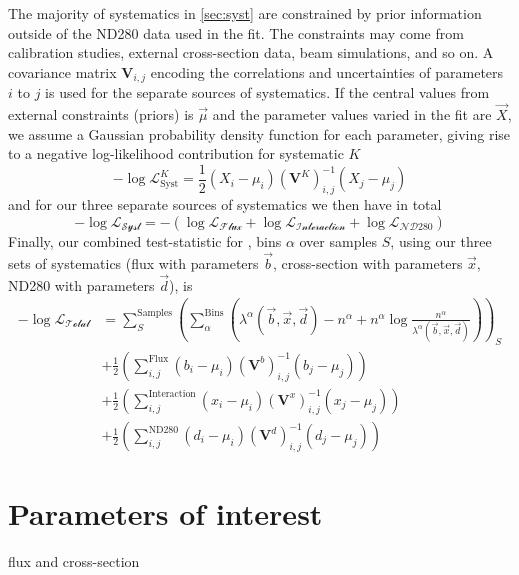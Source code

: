 The majority of systematics in \autoref{sec:syst} are constrained by prior information outside of the ND280 data used in the fit. The constraints may come from calibration studies, external cross-section data, beam simulations, and so on. A covariance matrix $\boldsymbol{V}_{i,j}$ encoding the correlations and uncertainties of parameters $i$ to $j$ is used for the separate sources of systematics. If the central values from external constraints (priors) is $\vec{\mu}$ and the parameter values varied in the fit are $\vec{X}$, we assume a Gaussian probability density function for each parameter, giving rise to a negative log-likelihood contribution for systematic $K$
\begin{equation}
-\log\mathcal{L}^K_\text{Syst} = \frac{1}{2}( X_i - \mu_i ) \left(\boldsymbol{V}^K\right)^{-1}_{i,j} ( X_j - \mu_j )
\end{equation}
and for our three separate sources of systematics we then have in total
\begin{equation}
-\log\mathcal{L_\text{Syst}} = -\left(\log\mathcal{L_\text{Flux}} + \log\mathcal{L_\text{Interaction}} + \log\mathcal{L_\text{ND280}}\right)
\end{equation}
Finally, our combined test-statistic for \pmu, \cosmu bins $\alpha$ over samples $S$, using our three sets of systematics (flux with parameters $\vec{b}$, cross-section with parameters $\vec{x}$, ND280 with parameters $\vec{d}$), is
\begin{equation}
\label{eq:test_stat}
\begin{split}
-\log\mathcal{L_\text{Total}} & =  \sum_S^\text{Samples} \left( \sum_{\alpha}^\text{Bins} \left( \lambda^\alpha(\vec{b},\vec{x},\vec{d}) - n^\alpha + n^\alpha\log\frac{n^\alpha}{\lambda^\alpha(\vec{b},\vec{x},\vec{d})} \right) \right)_S \\
 & + \frac{1}{2} \left( \sum_{i,j}^\text{Flux} ( b_i - \mu_i ) \left(\boldsymbol{V}^b\right)^{-1}_{i,j} ( b_j - \mu_j ) \right) \\
 & + \frac{1}{2} \left( \sum_{i,j}^\text{Interaction} ( x_i - \mu_i ) \left(\boldsymbol{V}^x\right)^{-1}_{i,j} ( x_j - \mu_j ) \right) \\
 & + \frac{1}{2} \left( \sum_{i,j}^\text{ND280} ( d_i - \mu_i ) \left(\boldsymbol{V}^d\right)^{-1}_{i,j} ( d_j - \mu_j ) \right)
\end{split}
\end{equation}

\section{Parameters of interest}
flux and cross-section

